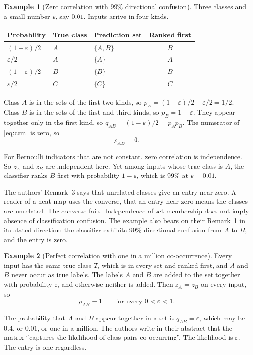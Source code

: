 \documentclass[11pt]{article}
\theoremstyle{definition}
\newtheorem{example}{Example}
\theoremstyle{definition}
\theoremstyle{remark}
\newcommand{\set}[1]{\{#1\}}
\begin{document}
\begin{example}[Zero correlation with 99\% directional confusion]\label{ex:zero}
Three classes and a small number $\varepsilon$, say $0.01$. Inputs arrive in four kinds.

\begin{center}
\begin{tabular}{lllc}
\toprule
Probability & True class & Prediction set & Ranked first \\
\midrule
$(1-\varepsilon)/2$ & $A$ & $\set{A, B}$ & $B$ \\
$\varepsilon/2$     & $A$ & $\set{A}$    & $A$ \\
$(1-\varepsilon)/2$ & $B$ & $\set{B}$    & $B$ \\
$\varepsilon/2$     & $C$ & $\set{C}$    & $C$ \\
\bottomrule
\end{tabular}
\end{center}

Class $A$ is in the sets of the first two kinds, so $p_A = (1-\varepsilon)/2 + \varepsilon/2 = 1/2$.
Class $B$ is in the sets of the first and third kinds, so $p_B = 1 - \varepsilon$. They appear together only in
the first kind, so $q_{AB} = (1-\varepsilon)/2 = p_A p_B$. The numerator of \eqref{eq:ccm} is zero,
so
\[
\rho_{AB} = 0 .
\]

For Bernoulli indicators that are not constant, zero correlation is independence. So $z_A$ and
$z_B$ are independent here. Yet among inputs whose true class is $A$, the classifier ranks $B$ first
with probability $1-\varepsilon$, which is 99\% at $\varepsilon = 0.01$.

The authors' Remark~3 says that unrelated classes give an entry near zero. A reader of a heat map
uses the converse, that an entry near zero means the classes are unrelated. The converse fails. Independence of set membership does not imply absence of classification
confusion. The example also bears on their Remark~1 in its stated direction: the classifier exhibits 99\% directional confusion from $A$ to $B$, and the entry is zero.
\end{example}

\begin{example}[Perfect correlation with one in a million co-occurrence]\label{ex:rare}
Every input has the same true class $T$, which is in every set and ranked first, and $A$ and $B$
never occur as true labels. The labels $A$ and $B$ are added to the set together with probability
$\varepsilon$, and otherwise neither is added. Then $z_A = z_B$ on every
input, so
\[
\rho_{AB} = 1 \qquad \text{for every } 0 < \varepsilon < 1 .
\]

The probability that $A$ and $B$ appear together in a set is $q_{AB} = \varepsilon$, which may be
$0.4$, or $0.01$, or one in a million. The authors write in their abstract that the matrix
``captures the likelihood of class pairs co-occurring''. The likelihood is $\varepsilon$. The entry
is one regardless.
\end{example}
\end{document}
